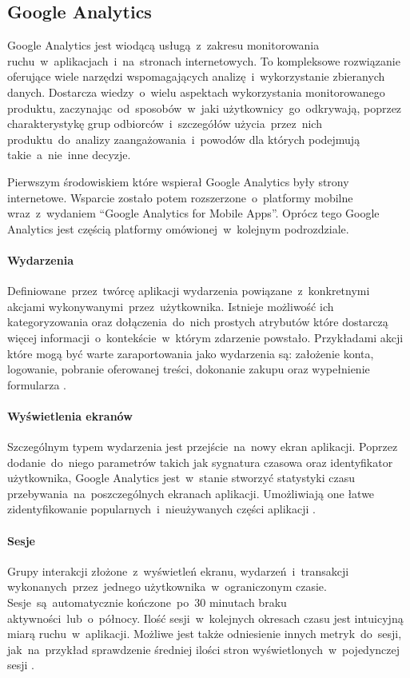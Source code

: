 \subsection{Google Analytics}
\label{sec:ga}
Google Analytics jest wiodącą usługą~z~zakresu monitorowania ruchu~w~aplikacjach~i~na~stronach internetowych. To kompleksowe rozwiązanie oferujące wiele narzędzi wspomagających analizę~i~wykorzystanie zbieranych danych. Dostarcza wiedzy~o~wielu aspektach wykorzystania monitorowanego produktu, zaczynając~od~sposobów~w~jaki użytkownicy~go~odkrywają, poprzez charakterystykę grup odbiorców~i~szczegółów użycia~przez~nich produktu~do~analizy zaangażowania~i~powodów dla których podejmują takie~a~nie~inne decyzje.

Pierwszym środowiskiem które wspierał Google Analytics były strony internetowe. Wsparcie zostało potem rozszerzone~o~platformy mobilne wraz~z~wydaniem ``Google Analytics for Mobile Apps''. Oprócz tego Google Analytics jest częścią platformy  omówionej~w~kolejnym podrozdziale.


\paragraph{Wydarzenia}
\label{par:ga-events}
Definiowane~przez~twórcę aplikacji wydarzenia powiązane~z~konkretnymi akcjami wykonywanymi~przez~użytkownika. Istnieje możliwość ich kategoryzowania oraz dołączenia~do~nich prostych atrybutów które dostarczą więcej informacji~o~kontekście~w~którym zdarzenie powstało. Przykładami akcji które mogą być warte zaraportowania jako wydarzenia są: założenie konta, logowanie, pobranie oferowanej treści, dokonanie zakupu oraz wypełnienie formularza \cite{GA_Events}.

\paragraph{Wyświetlenia ekranów}
Szczególnym typem wydarzenia jest przejście~na~nowy ekran aplikacji. Poprzez dodanie~do~niego parametrów takich jak sygnatura czasowa oraz identyfikator użytkownika, Google Analytics jest~w~stanie stworzyć statystyki czasu przebywania~na~poszczególnych ekranach aplikacji. Umożliwiają one łatwe zidentyfikowanie popularnych~i~nieużywanych części aplikacji \cite{GA_Pages}.

\paragraph{Sesje}
Grupy interakcji złożone~z~wyświetleń ekranu, wydarzeń~i~transakcji wykonanych~przez~jednego użytkownika~w~ograniczonym czasie. Sesje~są~automatycznie kończone~po~30 minutach braku aktywności~lub~o~północy. Ilość sesji~w~kolejnych okresach czasu jest intuicyjną miarą ruchu~w~aplikacji. Możliwe jest także odniesienie innych metryk~do~sesji, jak~na~przykład sprawdzenie średniej ilości stron wyświetlonych~w~pojedynczej sesji \cite{GA_Sessions}.

